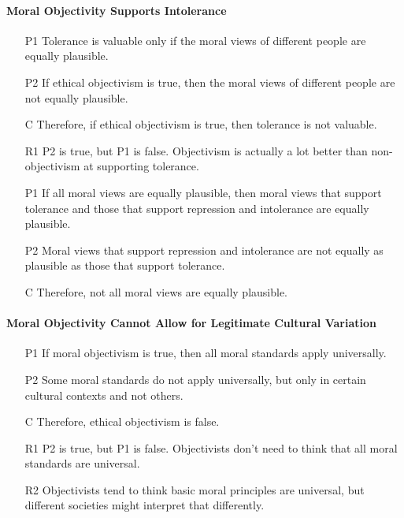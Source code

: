 \documentclass[12pt]{article}
\begin{document}
\paragraph{Moral Objectivity Supports Intolerance}
\begin{itemize}
    \item [P1] Tolerance is valuable only if the moral views of different people are equally plausible. 
    \item [P2] If ethical objectivism is true, then the moral views of different people are not equally plausible. 
    \item [C] Therefore, if ethical objectivism is true, then tolerance is not valuable.
    \item [R1] P2 is true, but P1 is false. Objectivism is actually a lot better than non-objectivism at supporting tolerance.
    \item [P1] If all moral views are equally plausible, then moral views that support tolerance and those that support repression and intolerance are equally plausible.
    \item [P2] Moral views that support repression and intolerance are not equally as plausible as those that support tolerance.
    \item [C] Therefore, not all moral views are equally plausible.
\end{itemize}

\paragraph{Moral Objectivity Cannot Allow for Legitimate Cultural Variation}
\begin{itemize}
    \item [P1] If moral objectivism is true, then all moral standards apply universally.
    \item [P2] Some moral standards do not apply universally, but only in certain cultural contexts and not others.
    \item [C] Therefore, ethical objectivism is false.
    \item [R1] P2 is true, but P1 is false. Objectivists don't need to think that all moral standards are universal. 
    \item [R2] Objectivists tend to think basic moral principles are universal, but different societies might interpret that differently.
\end{itemize}
\end{document}
